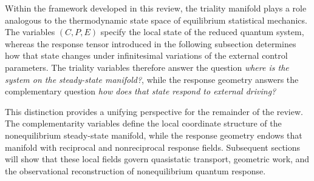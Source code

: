 Within the framework developed in this review, the
triality manifold plays a role analogous to the
thermodynamic state space of equilibrium statistical
mechanics. The variables $(C,P,E)$ specify the local
state of the reduced quantum system, whereas the
response tensor introduced in the following subsection
determines how that state changes under infinitesimal
variations of the external control parameters. The
triality variables therefore answer the question
\emph{where is the system on the steady-state manifold?},
while the response geometry answers the complementary
question \emph{how does that state respond to external
driving?}

This distinction provides a unifying perspective for the
remainder of the review. The complementarity variables
define the local coordinate structure of the
nonequilibrium steady-state manifold, while the response
geometry endows that manifold with reciprocal and
nonreciprocal response fields. Subsequent sections will
show that these local fields govern quasistatic
transport, geometric work, and the observational
reconstruction of nonequilibrium quantum response.

